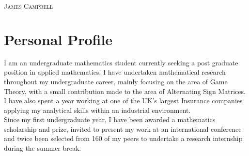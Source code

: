 \documentclass[a4paper]{article}
\begin{document}
\pagestyle{empty} %
\begin{multicols}{2}

\raggedright{\textsc{\Huge{James Campbell}}}\\
\columnbreak
{}

\end{multicols}
\section{Personal Profile}
I am an undergraduate mathematics student currently seeking a post graduate position in applied mathematics.
I have undertaken mathematical research throughout my undergraduate career, mainly focusing on the area of Game Theory, with a small contribution made to the area of Alternating Sign Matrices.
I have also spent a year working at one of the UK's largest Insurance companies applying my analytical skills within an industrial environment.
\\

Since my first undergraduate year, I have been awarded a mathematics scholarship and prize, invited to present my work at an international conference and twice been selected from 160 of my peers to undertake a research internship during the summer break.
\end{document}
